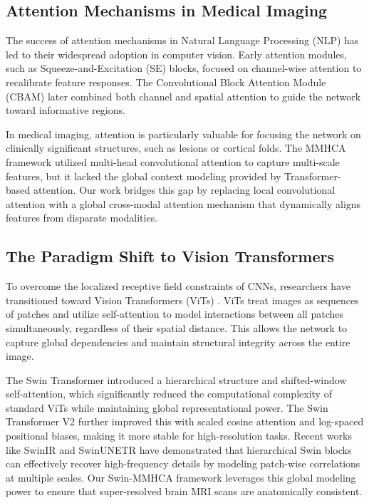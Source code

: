 \documentclass{IEEEoj}
\begin{document}
\subsection{Attention Mechanisms in Medical Imaging}
The success of attention mechanisms in Natural Language Processing (NLP) has led to their widespread adoption in computer vision. Early attention modules, such as Squeeze-and-Excitation (SE) blocks, focused on channel-wise attention to recalibrate feature responses. The Convolutional Block Attention Module (CBAM) later combined both channel and spatial attention to guide the network toward informative regions.

In medical imaging, attention is particularly valuable for focusing the network on clinically significant structures, such as lesions or cortical folds. The MMHCA framework \cite{Georgescu2023} utilized multi-head convolutional attention to capture multi-scale features, but it lacked the global context modeling provided by Transformer-based attention. Our work bridges this gap by replacing local convolutional attention with a global cross-modal attention mechanism that dynamically aligns features from disparate modalities.

\subsection{The Paradigm Shift to Vision Transformers}
To overcome the localized receptive field constraints of CNNs, researchers have transitioned toward Vision Transformers (ViTs) \cite{Sajol2024}. ViTs treat images as sequences of patches and utilize self-attention to model interactions between all patches simultaneously, regardless of their spatial distance. This allows the network to capture global dependencies and maintain structural integrity across the entire image.

The Swin Transformer introduced a hierarchical structure and shifted-window self-attention, which significantly reduced the computational complexity of standard ViTs while maintaining global representational power. The Swin Transformer V2 \cite{swin_trans} further improved this with scaled cosine attention and log-spaced positional biases, making it more stable for high-resolution tasks. Recent works like SwinIR and SwinUNETR \cite{SwinUNETR2025} have demonstrated that hierarchical Swin blocks can effectively recover high-frequency details by modeling patch-wise correlations at multiple scales. Our Swin-MMHCA framework leverages this global modeling power to ensure that super-resolved brain MRI scans are anatomically consistent.
\end{document}
